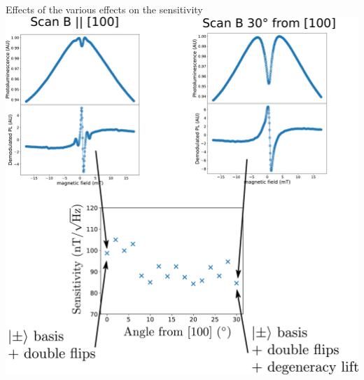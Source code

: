 \documentclass{beamer}
\begin{document}
\begin{frame}{Effects of the various effects on the sensitivity}
\centering
\includegraphics[width=\textwidth,height=0.9\textheight,keepaspectratio]{Slide magneto 3}
\end{frame}
\end{document}
